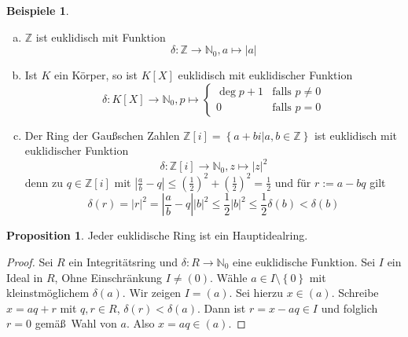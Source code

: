 \documentclass[
twoside=semi,
fontsize=12,
DIV=12, 
cleardoublepage=current,
leqno,
headings=optiontoheadandtoc, 
toc=idx
]{scrbook}
\newcommand{\N}{\mathbb{N}}
\newcommand{\Z}{\mathbb{Z}}
\newcommand{\brac}[1]{\left( #1 \right)}
\newcommand{\set}[1]{\left\{ #1 \right\}}
\theoremstyle{definition}
\newtheorem{beispiele}[definition]{Beispiele}
\newtheorem{proposition}[definition]{Proposition}
\begin{document}
	\begin{beispiele}\label{1.6.2}
		\begin{enumerate}[(a)]
			\item $\Z$ ist euklidisch mit Funktion 
				\[\delta: \Z \to \N_0, a \mapsto |a|\]
			\item Ist $K$ ein K\"orper, so ist $K[X]$ euklidisch mit euklidischer Funktion 
				\[\delta:K[X]\to\N_0, p \mapsto \begin{cases}
					\deg p + 1 & \textrm{falls } p \neq 0\\
					0 & \textrm{falls } p = 0
				\end{cases}\]
			\item Der Ring der Gaußschen Zahlen $\Z[i] = \set{a+bi|a,b \in \Z}$ ist euklidisch mit euklidischer Funktion 
				\[\delta: \Z[i] \to \N_0, z \mapsto |z|^2\]
			denn zu $q \in \Z[i]$ mit $\left| \frac{a}{b} - q\right| \leq \brac{\frac{1}{2}}^2 + \brac{\frac{1}{2}}^2 = \frac{1}{2}$ und f\"ur $r:= a - bq$ gilt 
				\[\delta(r) = |r|^2 = \left| \frac{a}{b} - q\right||b|^2 \leq \frac{1}{2}|b|^2 \leq \frac{1}{2}\delta(b) < \delta(b)\]
		\end{enumerate}
	\end{beispiele}

	\begin{proposition}\label{1.6.3}
		Jeder euklidische Ring ist ein Hauptidealring.
		
		\begin{proof}
			Sei $R$ ein Integrit\"atsring und $\delta:R\to\N_0$ eine euklidische Funktion. Sei $I$ ein Ideal in $R$, Ohne Einschr\"ankung $I \neq (0)$. W\"ahle $a \in I\setminus\set{0}$
			mit kleinstm\"oglichem $\delta(a)$. Wir zeigen $I= (a)$. Sei hierzu $x\in (a)$. Schreibe $x = aq+r$ mit $q,r \in R$, $\delta(r)< \delta(a)$. Dann ist $r = x-aq \in I$ und folglich $r=0$ gem\"a\ss\ Wahl von $a$. Also $x = aq \in (a)$.
		\end{proof}
	\end{proposition}
\end{document}

